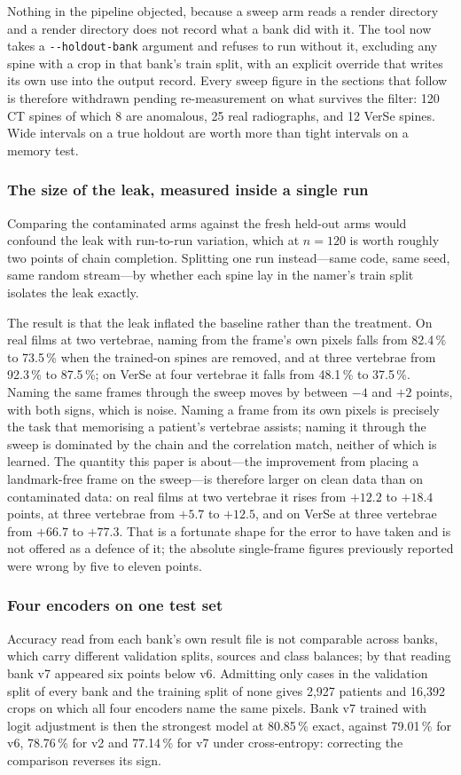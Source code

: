 \documentclass[11pt,letterpaper]{article}
\begin{document}
Nothing in the pipeline objected, because a sweep arm reads a render directory and a render directory does not record what a bank did with it. The tool now takes a \texttt{-{}-holdout-bank} argument and refuses to run without it, excluding any spine with a crop in that bank's train split, with an explicit override that writes its own use into the output record. Every sweep figure in the sections that follow is therefore withdrawn pending re-measurement on what survives the filter: 120 CT spines of which 8 are anomalous, 25 real radiographs, and 12 VerSe spines. Wide intervals on a true holdout are worth more than tight intervals on a memory test.

\subsubsection*{The size of the leak, measured inside a single run}
Comparing the contaminated arms against the fresh held-out arms would confound the leak with run-to-run variation, which at $n=120$ is worth roughly two points of chain completion. Splitting one run instead---same code, same seed, same random stream---by whether each spine lay in the namer's train split isolates the leak exactly.

The result is that the leak inflated the baseline rather than the treatment. On real films at two vertebrae, naming from the frame's own pixels falls from 82.4\,\% to 73.5\,\% when the trained-on spines are removed, and at three vertebrae from 92.3\,\% to 87.5\,\%; on VerSe at four vertebrae it falls from 48.1\,\% to 37.5\,\%. Naming the same frames through the sweep moves by between $-4$ and $+2$ points, with both signs, which is noise. Naming a frame from its own pixels is precisely the task that memorising a patient's vertebrae assists; naming it through the sweep is dominated by the chain and the correlation match, neither of which is learned. The quantity this paper is about---the improvement from placing a landmark-free frame on the sweep---is therefore larger on clean data than on contaminated data: on real films at two vertebrae it rises from $+12.2$ to $+18.4$ points, at three vertebrae from $+5.7$ to $+12.5$, and on VerSe at three vertebrae from $+66.7$ to $+77.3$. That is a fortunate shape for the error to have taken and is not offered as a defence of it; the absolute single-frame figures previously reported were wrong by five to eleven points.

\subsubsection*{Four encoders on one test set}
Accuracy read from each bank's own result file is not comparable across banks, which carry different validation splits, sources and class balances; by that reading bank v7 appeared six points below v6. Admitting only cases in the validation split of every bank and the training split of none gives 2,927 patients and 16,392 crops on which all four encoders name the same pixels. Bank v7 trained with logit adjustment is then the strongest model at 80.85\,\% exact, against 79.01\,\% for v6, 78.76\,\% for v2 and 77.14\,\% for v7 under cross-entropy: correcting the comparison reverses its sign.
\end{document}
